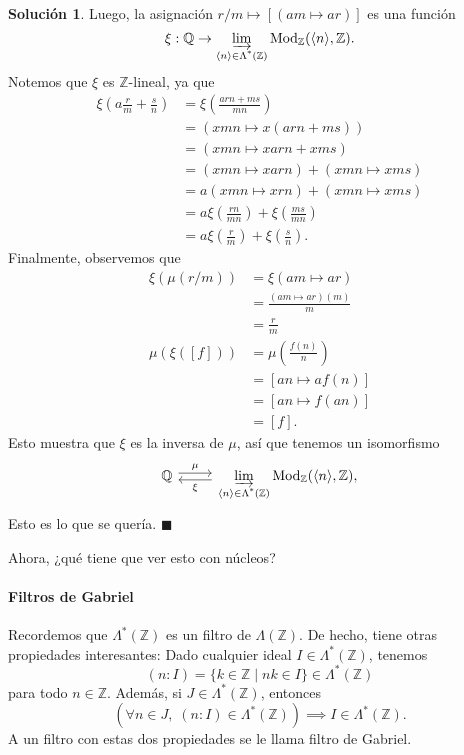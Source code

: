 \documentclass[12pt,letterpaper,titlepage]{article}
\newcommand{\xqed}[1]{%
  \leavevmode\unskip\penalty9999 \hbox{}\nobreak\hfill
  \quad\hbox{\ensuremath{#1}}}
\theoremstyle{definition}
\newtheorem*{soltemp}{Solución}
\newenvironment{sol}[1]{%
    \begin{soltemp}#1}{%
    \xqed{\blacksquare}\end{soltemp}%
}
\newcommand\Z{\mathbb Z}
\newcommand\Q{\mathbb Q}
\newcommand\nti[1]{\Lambda^{\text{*}}({#1})}
\newcommand\<{\langle}
\renewcommand\>{\rangle}
\newcommand{\Mod}{\mathrm{Mod}}
\begin{document}
\begin{sol}
    Luego, la asignación $r/m\mapsto [(am\mapsto ar)]$
    es una función
    \[
        \xi:\Q\to\varinjlim_{\<n\>\in\nti\Z}\Mod_\Z(\<n\>,\Z)
    .\]
    Notemos que $\xi$ es $\Z$-lineal, ya que
    \begin{align*}
        \xi\left(a\frac r m + \frac s n\right)
        &= \xi\left(\frac{arn + ms}{mn}\right) \\
        &= \left( xmn \mapsto x(arn+ms) \right) \\
        &= (xmn \mapsto xarn+xms) \\
        &= (xmn \mapsto xarn) + (xmn \mapsto xms) \\
        &= a(xmn \mapsto xrn) + (xmn \mapsto xms) \\
        &= a\xi\left(\frac{rn}{mn}\right)
            + \xi\left(\frac{ms}{mn}\right) \\
        &= a\xi\left(\frac{r}{m}\right)
            + \xi\left(\frac{s}{n}\right).
    \end{align*}
    Finalmente, observemos que
    \begin{align*}
        \xi(\mu(r/m))
        &= \xi(am\mapsto ar) \\
        &= \frac{(am\mapsto ar)(m)}{m} \\
        &= \frac{r}{m} \\
        \mu(\xi([f]))
        &= \mu\left(\frac{f(n)} n \right) \\
        &= [an\mapsto af(n)] \\
        &= [an\mapsto f(an)] \\
        &= [f]
    .\end{align*}
    Esto muestra que $\xi$ es la inversa de $\mu$,
    así que tenemos un isomorfismo
    \[
        \begin{tikzcd}
        \mathbb Q \ar[r,shift left,"\mu"] &
        \displaystyle
        \varinjlim_{\<n\>\in\nti\Z}\Mod_\Z(\<n\>,\Z),
        \ar[l,shift left,"\xi"]
       \end{tikzcd} 
    \]
    Esto es lo que se quería.
\end{sol}

Ahora, ¿qué tiene que ver esto con núcleos?

\paragraph{Filtros de Gabriel}
Recordemos que $\nti\Z$ es un filtro de $\Lambda(\Z)$.
De hecho, tiene otras propiedades interesantes:
Dado cualquier ideal $I\in\nti\Z$, tenemos
\[
    (n:I)=\{k\in\Z\mid nk\in I\}\in\nti\Z
\]
para todo $n\in\Z$.
Además, si $J\in\nti\Z$, entonces
\[
    (\forall n\in J,\; (n:I)\in\nti\Z)\implies I\in\nti\Z
.\]
A un filtro con estas dos propiedades se le llama filtro de Gabriel.
\end{document}

